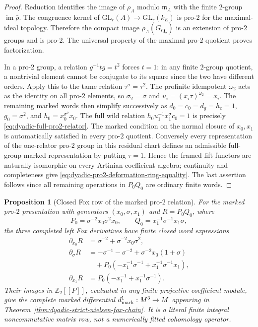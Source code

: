 \documentclass[11pt]{article}
\newtheorem{proposition}[theorem]{Proposition}
\theoremstyle{definition}
\begin{document}
\begin{proof}
Reduction identifies the image of $\rho_A$
modulo $\mathfrak m_A$ with the finite
$2$-group $\operatorname{im}\bar\rho$.
The congruence kernel of
$\mathrm{GL}_r(A)\to\mathrm{GL}_r(k_E)$
is pro-$2$ for the maximal-ideal
topology.  Therefore the compact image
$\rho_A(G_{\mathbf Q_2})$ is an extension
of pro-$2$ groups and is pro-$2$.
The universal property of the maximal
pro-$2$ quotient proves factorization.

In a pro-$2$ group, a relation
$g^{-1}tg=t^2$ forces $t=1$:
in any finite $2$-group quotient, a
nontrivial element cannot be conjugate
to its square since the two have
different orders.  Apply this to the
tame relation
$\tau^\sigma=\tau^2$.
The profinite idempotent $\omega_2$
acts as the identity on all pro-$2$
elements, so
$\sigma_2=\sigma$ and
$u_i=(x_i\tau)^{\omega_2}=x_i$.
The remaining marked words then simplify
successively as
$d_0=c_0=d_g=h_c=1$,
$g_0=\sigma^2$, and
$h_0=x_0^{\sigma^2}x_0$.
The full wild relation
$h_0u_1^{-1}x_1^\sigma c_0=1$
is precisely
\eqref{eq:dyadic-full-pro2-relator}.
The marked condition on the normal closure
of $x_0,x_1$ is automatically satisfied
in every pro-$2$ quotient.
Conversely every representation of the
one-relator pro-$2$ group in this residual
chart defines an admissible full-group
marked representation by putting
$\tau=1$.  Hence the framed lift functors
are naturally isomorphic on every
Artinian coefficient algebra; continuity
and completeness give
\eqref{eq:dyadic-pro2-deformation-ring-equality}.
The last assertion follows since all
remaining operations in $P_0Q_0$
are ordinary finite words.
\end{proof}

\begin{proposition}[Closed Fox row of the marked pro-$2$ relation]
\label{prop:dyadic-closed-marked-fox-row}
For the marked pro-$2$ presentation with
generators $(x_0,\sigma,x_1)$ and
$R=P_0Q_0$, where
\[
P_0=\sigma^{-2}x_0\sigma^2x_0,\qquad
Q_0=x_1^{-1}\sigma^{-1}x_1\sigma,
\]
the three completed \emph{left} Fox derivatives
have finite closed word expressions
\begin{equation}\label{eq:dyadic-closed-marked-fox-row}
\boxed{
\begin{aligned}
\partial_{x_0}R
  &=\sigma^{-2}+\sigma^{-2}x_0\sigma^2,\\
\partial_{\sigma}R
  &=-\sigma^{-1}-\sigma^{-2}
     +\sigma^{-2}x_0(1+\sigma)\\
  &\hspace{1em}
     +P_0(-x_1^{-1}\sigma^{-1}
           +x_1^{-1}\sigma^{-1}x_1),\\
\partial_{x_1}R
  &=P_0(-x_1^{-1}+x_1^{-1}\sigma^{-1}).
\end{aligned}}
\end{equation}
Their images in $\mathbb Z_2[[P]]$,
evaluated in any finite projective
coefficient module, give the complete
marked differential
$d^1_{\rm mark}:M^3\to M$
appearing in
Theorem~\ref{thm:dyadic-strict-nielsen-fox-chain}.
It is a literal finite integral
noncommutative matrix row, not a
numerically fitted cohomology operator.
\end{proposition}
\end{document}
